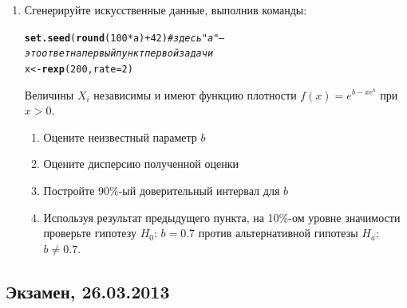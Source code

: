 \documentclass[12pt, a4paper]{article}\usepackage[]{graphicx}\usepackage[]{color}
\makeatletter
\newcommand{\hlnum}[1]{\textcolor[rgb]{0.686,0.059,0.569}{#1}}%
\newcommand{\hlcom}[1]{\textcolor[rgb]{0.678,0.584,0.686}{\textit{#1}}}%
\newcommand{\hlopt}[1]{\textcolor[rgb]{0,0,0}{#1}}%
\newcommand{\hlstd}[1]{\textcolor[rgb]{0.345,0.345,0.345}{#1}}%
\newcommand{\hlkwb}[1]{\textcolor[rgb]{0.69,0.353,0.396}{#1}}%
\newcommand{\hlkwc}[1]{\textcolor[rgb]{0.333,0.667,0.333}{#1}}%
\newcommand{\hlkwd}[1]{\textcolor[rgb]{0.737,0.353,0.396}{\textbf{#1}}}%
\newenvironment{kframe}{%
 \def\at@end@of@kframe{}%
 \ifinner\ifhmode%
  \def\at@end@of@kframe{\end{minipage}}%
  \begin{minipage}{\columnwidth}%
 \fi\fi%
 \def\FrameCommand##1{\hskip\@totalleftmargin \hskip-\fboxsep
 \colorbox{shadecolor}{##1}\hskip-\fboxsep
     \hskip-\linewidth \hskip-\@totalleftmargin \hskip\columnwidth}%
 \MakeFramed {\advance\hsize-\width
   \@totalleftmargin\z@ \linewidth\hsize
   \@setminipage}}%
 {\par\unskip\endMakeFramed%
 \at@end@of@kframe}
\newenvironment{knitrout}{}{} %
\makeatother
\begin{document}
\begin{enumerate}
\item Сгенерируйте искусственные данные, выполнив команды:
\begin{knitrout}
\color{fgcolor}\begin{kframe}
\begin{alltt}
\hlkwd{set.seed}\hlstd{(}\hlkwd{round}\hlstd{(}\hlnum{100} \hlopt{*} \hlstd{a)} \hlopt{+} \hlnum{42}\hlstd{)} \hlcom{# здесь "a" — это ответ на первый пункт первой задачи}
\hlstd{x} \hlkwb{<-} \hlkwd{rexp}\hlstd{(}\hlnum{200}\hlstd{,} \hlkwc{rate} \hlstd{=} \hlnum{2}\hlstd{)}
\end{alltt}
\end{kframe}
\end{knitrout}

Величины $X_i$ независимы и имеют функцию плотности $f(x)=e^{b-xe^b}$ при $x>0$.
\begin{enumerate}
\item Оцените неизвестный параметр $b$
\item Оцените дисперсию полученной оценки
\item Постройте 90\%-ый доверительный интервал для $b$
\item Используя результат предыдущего пункта, на 10\%-ом уровне значимости проверьте гипотезу $H_0$: $b=0.7$ против альтернативной гипотезы $H_a$: $b\neq 0.7$.
\end{enumerate}

\end{enumerate}


\subsection{Экзамен, 26.03.2013}
\end{document}
